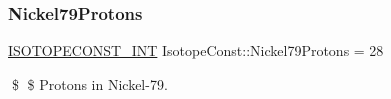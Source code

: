 \subsubsection{\texorpdfstring{Nickel79\+Protons}{Nickel79Protons}}
{\footnotesize\ttfamily \mbox{\hyperlink{group___isotope_const-_macros_ga5f18360b3e99483a35c32d789e62621c}{I\+S\+O\+T\+O\+P\+E\+C\+O\+N\+S\+T\+\_\+\+I\+NT}} Isotope\+Const\+::\+Nickel79\+Protons = 28}

\$ \$ Protons in Nickel-\/79. 